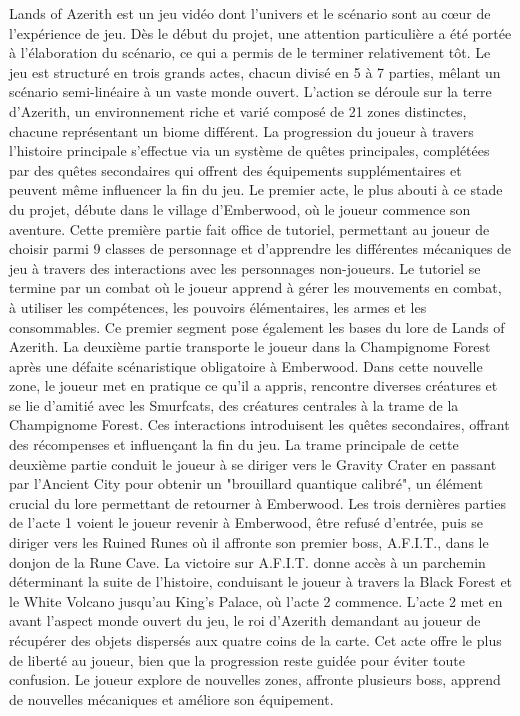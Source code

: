 Lands of Azerith est un jeu vidéo dont l'univers et le scénario sont au cœur de l'expérience de jeu. Dès le début du projet, une attention particulière a été portée à l'élaboration du scénario, ce qui a permis de le terminer relativement tôt. Le jeu est structuré en trois grands actes, chacun divisé en 5 à 7 parties, mêlant un scénario semi-linéaire à un vaste monde ouvert. L'action se déroule sur la terre d'Azerith, un environnement riche et varié composé de 21 zones distinctes, chacune représentant un biome différent.
La progression du joueur à travers l'histoire principale s'effectue via un système de quêtes principales, complétées par des quêtes secondaires qui offrent des équipements supplémentaires et peuvent même influencer la fin du jeu. Le premier acte, le plus abouti à ce stade du projet, débute dans le village d'Emberwood, où le joueur commence son aventure. Cette première partie fait office de tutoriel, permettant au joueur de choisir parmi 9 classes de personnage et d'apprendre les différentes mécaniques de jeu à travers des interactions avec les personnages non-joueurs.
Le tutoriel se termine par un combat où le joueur apprend à gérer les mouvements en combat, à utiliser les compétences, les pouvoirs élémentaires, les armes et les consommables. Ce premier segment pose également les bases du lore de Lands of Azerith.
La deuxième partie transporte le joueur dans la Champignome Forest après une défaite scénaristique obligatoire à Emberwood. Dans cette nouvelle zone, le joueur met en pratique ce qu'il a appris, rencontre diverses créatures et se lie d'amitié avec les Smurfcats, des créatures centrales à la trame de la Champignome Forest. Ces interactions introduisent les quêtes secondaires, offrant des récompenses et influençant la fin du jeu.
La trame principale de cette deuxième partie conduit le joueur à se diriger vers le Gravity Crater en passant par l'Ancient City pour obtenir un "brouillard quantique calibré", un élément crucial du lore permettant de retourner à Emberwood. Les trois dernières parties de l'acte 1 voient le joueur revenir à Emberwood, être refusé d'entrée, puis se diriger vers les Ruined 
Runes où il affronte son premier boss, A.F.I.T., dans le donjon de la Rune Cave. La victoire sur A.F.I.T. donne accès à un parchemin déterminant la suite de l'histoire, conduisant le joueur à travers la Black Forest et le White Volcano jusqu'au King's Palace, où l'acte 2 commence.
L'acte 2 met en avant l'aspect monde ouvert du jeu, le roi d'Azerith demandant au joueur de récupérer des objets dispersés aux quatre coins de la carte. Cet acte offre le plus de liberté au joueur, bien que la progression reste guidée pour éviter toute confusion. Le joueur explore de nouvelles zones, affronte plusieurs boss, apprend de nouvelles mécaniques et améliore son équipement.

